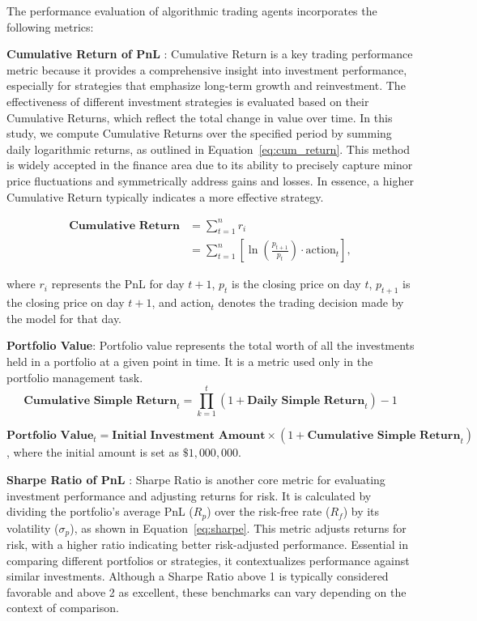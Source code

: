 The performance evaluation of algorithmic trading agents incorporates the following metrics:\par
\textbf{Cumulative Return of PnL} \cite{hull2007risk}: Cumulative Return is a key trading performance metric because it provides a comprehensive insight into investment performance, especially for strategies that emphasize long-term growth and reinvestment. The effectiveness of different investment strategies is evaluated based on their Cumulative Returns, which reflect the total change in value over time. In this study, we compute Cumulative Returns over the specified period by summing daily logarithmic returns, as outlined in Equation~\ref{eq:cum_return}. This method is widely accepted in the finance area due to its ability to precisely capture minor price fluctuations and symmetrically address gains and losses. In essence, a higher Cumulative Return typically indicates a more effective strategy.

\begin{align}
    \textbf{Cumulative Return} &= \sum_{t=1}^{n} r_i \nonumber \\
                                   &= \sum_{t=1}^{n} \left[ \ln\left(\frac{p_{t+1}}{p_t}\right) \cdot \text{action}_t \right],
    \label{eq:cum_return}
\end{align}

where $r_i$ represents the PnL for day $t+1$, $p_t$ is the closing price on day $t$, $p_{t+1}$ is the closing price on day $t+1$, and $\text{action}_t$ denotes the trading decision made by the model for that day.

\textbf{Portfolio Value}: Portfolio value represents the total worth of all the investments held in a portfolio at a given point in time. It is a metric used only in the portfolio management task.
\begin{equation}
    \textbf{Cumulative Simple Return}_t =  \prod_{k=1}^{t} (1 + \textbf{Daily Simple Return}_t) - 1
    \label{eq:cr_simple}
\end{equation}

\begin{equation}
    \textbf{Portfolio Value}_t = \textbf{Initial Investment Amount} \times (1 + \textbf{Cumulative Simple Return}_t)
    \label{eq:portfolio_value}
\end{equation}
, where the initial amount is set as $\$1,000,000$.


\textbf{Sharpe Ratio of PnL} \cite{sharpe1994sharpe}: Sharpe Ratio is another core metric for evaluating investment performance and adjusting returns for risk. It is calculated by dividing the portfolio's average PnL ($R_p$) over the risk-free rate ($R_f$) by its volatility ($\sigma_p$), as shown in Equation~\ref{eq:sharpe}. This metric adjusts returns for risk, with a higher ratio indicating better risk-adjusted performance. Essential in comparing different portfolios or strategies, it contextualizes performance against similar investments. Although a Sharpe Ratio above 1 is typically considered favorable and above 2 as excellent, these benchmarks can vary depending on the context of comparison.
  
